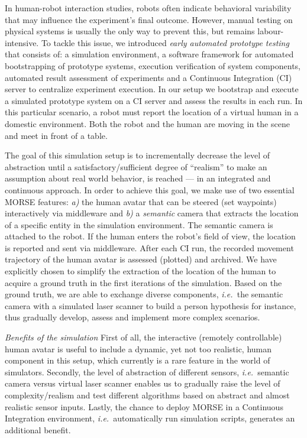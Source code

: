 \documentclass{llncs}
\newcommand{\ie}{{\textit{i.e.~}}}
\begin{document}
In human-robot interaction studies, robots often indicate behavioral variability
that may influence the experiment's final outcome.  However, manual testing on
physical systems is usually the only way to prevent this, but remains
labour-intensive. To tackle this issue, we introduced \emph{early automated
prototype testing}~\cite{2645922} that consists of: a simulation environment, a
software framework for automated bootstrapping of prototype systems, execution
verification of system components, automated result assessment of experiments
and a Continuous Integration (CI) server to centralize experiment execution. In
our setup we bootstrap and execute a simulated prototype system on a CI server
and assess the results in each run. In this particular scenario, a robot must
report the location of a virtual human in a domestic environment. Both the
robot and the human are moving in the scene and meet in front of a table.


The goal of this simulation setup is to incrementally decrease the level of
abstraction until a satisfactory/sufficient degree of ``realism'' to make an
assumption about real world behavior, is reached --- in an integrated and
continuous approach. In order to achieve this goal, we make use of two essential
MORSE features: \textit{a)} the human avatar that can be steered (set waypoints)
interactively via middleware and \textit{b)} a \emph{semantic} camera that
extracts the location of a specific entity in the simulation environment.  The
semantic camera is attached to the robot. If the human enters the robot's field
of view, the location is reported and sent via middleware. After each CI run,
the recorded movement trajectory of the human avatar is assessed (plotted) and
archived. We have explicitly chosen to simplify the extraction of the location
of the human to acquire a ground truth in the first iterations of the
simulation. Based on the ground truth, we are able to exchange diverse
components, \ie the semantic camera with a simulated laser scanner to build a
person hypothesis for instance, thus gradually develop, assess and implement
more complex scenarios. 

\emph{Benefits of the simulation} First of all, the interactive (remotely
controllable) human avatar is useful to include a dynamic, yet not too
realistic, human component in this setup, which currently is a rare feature in
the world of simulators. Secondly, the level of abstraction of different
sensors, \ie semantic camera versus virtual laser scanner enables us to
gradually raise the level of complexity/realism and test different algorithms
based on abstract and almost realistic sensor inputs.  Lastly, the chance to
deploy MORSE in a Continuous Integration environment, \ie automatically run
simulation scripts, generates an additional benefit.
 
\end{document}
